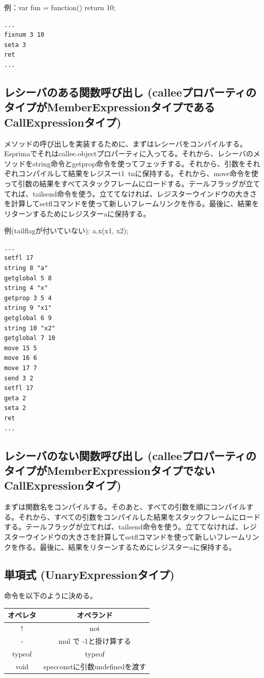 \documentclass[12pt]{article}
\begin{document}
例：var fun = function(){	return 10; }\\

\begin{lstlisting}
...
fixnum 3 10
seta 3
ret
...
\end{lstlisting}

\subsection{レシーバのある関数呼び出し (calleeプロパーティのタイプがMemberExpressionタイプであるCallExpressionタイプ)}
メソッドの呼び出しを実装するために、まずはレシーバをコンパイルする。Esprimaでそれはcallee.objectプロパーティに入ってる。それから、レシーバのメソッドをstring命令とgetprop命令を使ってフェッチする。それから、引数をそれぞれコンパイルして結果をレジスーt1~tnに保持する。それから、move命令を使って引数の結果をすべてスタックフレームにロードする。テールフラッグが立ててれば、tailsend命令を使う。立ててなければ、レジスターウインドウの大きさを計算してsetflコマンドを使って新しいフレームリンクを作る。最後に、結果をリターンするためにレジスターaに保持する。

例(tailflagが付いていない): a.x(x1, x2); \\

\begin{lstlisting}
...
setfl 17
string 8 "a"
getglobal 5 8
string 4 "x"
getprop 3 5 4
string 9 "x1"
getglobal 6 9
string 10 "x2"
getglobal 7 10
move 15 5
move 16 6
move 17 7
send 3 2
setfl 17
geta 2
seta 2
ret
...
\end{lstlisting}

\subsection{レシーバのない関数呼び出し (calleeプロパーティのタイプがMemberExpressionタイプでないCallExpressionタイプ)}
まずは関数名をコンパイルする。そのあと、すべての引数を順にコンパイルする。それから、すべての引数をコンパイルした結果をスタックフレームにロードする。テールフラッグが立てれば、tailsend命令を使う。立ててなければ、レジスターウインドウの大きさを計算してsetflコマンドを使って新しいフレームリンクを作る。最後に、結果をリターンするためにレジスターaに保持する。

\subsection{単項式 (UnaryExpressionタイプ)}
命令を以下のように決める。

\begin{table}[h]
\centering
\begin{tabular}{|c|c|}
	\hline
	オペレタ & オペランド \\
	\hline
	! & not \\
	- & mul で -1と掛け算する \\
	typeof & typeof \\
	void & specconstに引数undefinedを渡す \\
	\hline
\end{tabular}
\end{table}
\FloatBarrier
\end{document}
